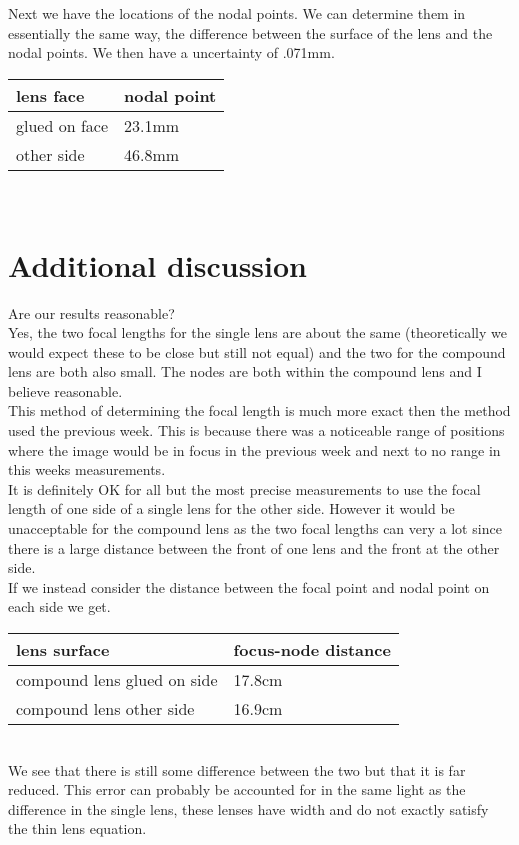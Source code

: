 \documentclass[12pt,a4paper]{article}
\begin{document}
Next we have the locations of the nodal points.  We can determine them in essentially the same way, the difference between the surface of the lens and the nodal points.  We then have a uncertainty of .071mm.\\
\begin{tabular}{|l|l|}
\hline
lens face & nodal point\\
\hline
glued on face & 23.1mm\\
\hline
other side & 46.8mm\\
\hline

\end{tabular}\\

\section{Additional discussion}
Are our results reasonable?\\
Yes, the two focal lengths for the single lens are about the same (theoretically we would expect these to be close but still not equal) and the two for the compound lens are both also small.  The nodes are both within the compound lens and I believe reasonable.\\

This method of determining the focal length is much more exact then the method used the previous week.  This is because there was a noticeable range of positions where the image would be in focus in the previous week and next to no range in this weeks measurements.\\

It is definitely OK for all but the most precise measurements to use the focal length of one side of a single lens for the other side.  However it would be unacceptable for the compound lens as the two focal lengths can very a lot since there is a large distance between the front of one lens and the front at the other side.\\

If we instead consider the distance between the focal point and nodal point on each side we get.

\begin{tabular}{|l|l|}
\hline
lens surface & focus-node distance \\
\hline
compound lens glued on side & 17.8cm \\
\hline
compound lens other side & 16.9cm \\
\hline

\end{tabular}\\

We see that there is still some difference between the two but that it is far reduced.  This error can probably be accounted for in the same light as the difference in the single lens,  these lenses have width and do not exactly satisfy the thin lens equation.
\end{document}
